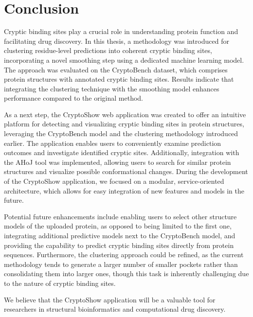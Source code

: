 \chapter*{Conclusion}

Cryptic binding sites play a crucial role in understanding protein function and facilitating drug discovery. In this thesis, a methodology was introduced for clustering residue-level predictions into coherent cryptic binding sites, incorporating a novel smoothing step using a dedicated machine learning model. The approach was evaluated on the CryptoBench dataset, which comprises protein structures with annotated cryptic binding sites. Results indicate that integrating the clustering technique with the smoothing model enhances performance compared to the original method.

As a next step, the CryptoShow web application was created to offer an intuitive platform for detecting and visualizing cryptic binding sites in protein structures, leveraging the CryptoBench model and the clustering methodology introduced earlier. The application enables users to conveniently examine prediction outcomes and investigate identified cryptic sites. Additionally, integration with the AHoJ tool was implemented, allowing users to search for similar protein structures and visualize possible conformational changes. During the development of the CryptoShow application, we focused on a modular, service-oriented architecture, which allows for easy integration of new features and models in the future.

Potential future enhancements include enabling users to select other structure models of the uploaded protein, as opposed to being limited to the first one, integrating additional predictive models next to the CryptoBench model, and providing the capability to predict cryptic binding sites directly from protein sequences. Furthermore, the clustering approach could be refined, as the current methodology tends to generate a larger number of smaller pockets rather than consolidating them into larger ones, though this task is inherently challenging due to the nature of cryptic binding sites.

We believe that the CryptoShow application will be a valuable tool for researchers in structural bioinformatics and computational drug discovery.
